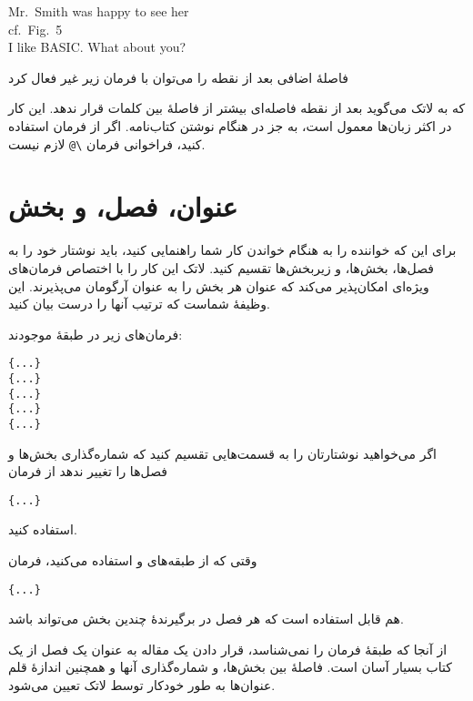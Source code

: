 \begin{example}
Mr.~Smith was happy to see her\\
cf.~Fig.~5\\
I like BASIC\@. What about you?
\end{example}

فاصلهٔ اضافی بعد از نقطه را می‌توان با فرمان زیر غیر فعال کرد
\begin{lscommand}
\end{lscommand}
\noindent 
که به لاتک می‌گوید بعد از نقطه فاصله‌ای بیشتر از فاصلهٔ بین کلمات قرار ندهد. این کار در اکثر زبان‌ها معمول است، به جز در هنگام نوشتن کتاب‌نامه. اگر از فرمان 
استفاده کنید، فراخوانی فرمان 
\verb|\@|
لازم نیست.
\section{عنوان، فصل، و بخش}
برای این که خواننده را به هنگام خواندن کار شما راهنمایی کنید، باید نوشتار خود را به فصل‌ها، بخش‌ها، و زیربخش‌ها تقسیم کنید. لاتک این کار را با اختصاص فرمان‌های ویژه‌ای امکان‌پذیر می‌کند که عنوان هر بخش را به عنوان آرگومان می‌پذیرند. این وظیفهٔ شماست که ترتیب آنها را درست بیان کنید.

فرمان‌های زیر در طبقهٔ 
موجودند:
 \nopagebreak

\begin{lscommand}
\verb|{...}|\\
\verb|{...}|\\
\verb|{...}|\\
\verb|{...}|\\
\verb|{...}|
\end{lscommand}

اگر می‌خواهید نوشتارتان را به قسمت‌هایی تقسیم کنید که شماره‌گذاری بخش‌ها و فصل‌ها را تغییر ندهد از فرمان 
\begin{lscommand}
\verb|{...}|
\end{lscommand}
\noindent استفاده کنید.

وقتی که از طبقه‌های 
و
استفاده می‌کنید، فرمان 
\begin{lscommand}
\verb|{...}|
\end{lscommand}
\noindent هم قابل استفاده است که هر فصل در برگیرندهٔ  چندین بخش می‌تواند باشد.

از آنجا که طبقهٔ 
فرمان 
را نمی‌شناسد، قرار دادن یک مقاله به عنوان یک فصل از یک کتاب بسیار آسان است. فاصلهٔ بین بخش‌ها، و شماره‌گذاری‌ آنها و همچنین اندازهٔ قلم عنوان‌ها به طور خودکار توسط لاتک تعیین می‌شود.

